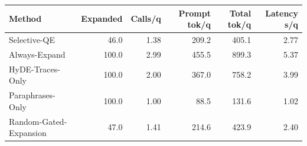 \begin{tabular}{lrrrrr}
\toprule
Method & Expanded & Calls/q & Prompt tok/q & Total tok/q & Latency s/q \\
\midrule
Selective-QE & 46.0 & 1.38 & 209.2 & 405.1 & 2.77 \\
Always-Expand & 100.0 & 2.99 & 455.5 & 899.3 & 5.37 \\
HyDE-Traces-Only & 100.0 & 2.00 & 367.0 & 758.2 & 3.99 \\
Paraphrases-Only & 100.0 & 1.00 & 88.5 & 131.6 & 1.02 \\
Random-Gated-Expansion & 47.0 & 1.41 & 214.6 & 423.9 & 2.40 \\
\bottomrule
\end{tabular}
